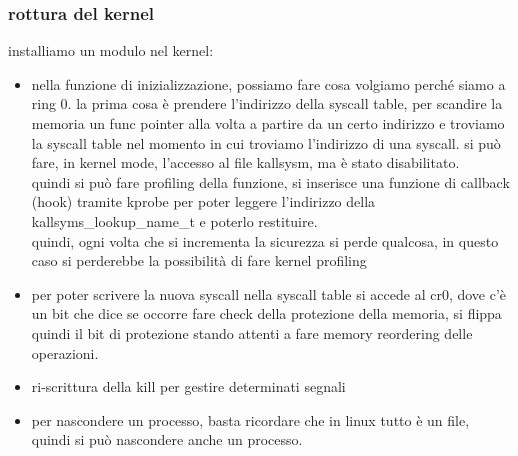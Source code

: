 \documentclass[12pt, oneside]{extbook} %
\begin{document}
\subsubsection{rottura del kernel}
installiamo un modulo nel kernel:
\begin{itemize}
\item nella funzione di inizializzazione, possiamo fare cosa volgiamo perché siamo a ring 0. la prima cosa è prendere l'indirizzo della syscall table, per scandire la memoria un func pointer alla volta a partire da un certo indirizzo e troviamo la syscall table nel momento in cui troviamo l'indirizzo di una syscall. si può fare, in kernel mode, l'accesso al file kallsysm, ma è stato disabilitato.\\quindi si può fare profiling della funzione, si inserisce una funzione di callback (hook) tramite kprobe per poter leggere l'indirizzo della kallsyms\_lookup\_name\_t e poterlo restituire.\\ quindi, ogni volta che si incrementa la sicurezza si perde qualcosa, in questo caso si perderebbe la possibilità di fare kernel profiling
\item per poter scrivere la nuova syscall nella syscall table si accede al cr0, dove c'è un bit che dice se occorre fare check della protezione della memoria, si flippa quindi il bit di protezione stando attenti a fare memory reordering delle operazioni.
\item ri-scrittura della kill per gestire determinati segnali
\item per nascondere un processo, basta ricordare che in linux tutto è un file, quindi si può nascondere anche un processo.
\end{itemize}
\end{document}
